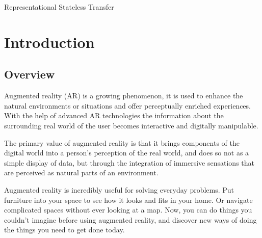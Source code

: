 \documentclass[BTech]{srmuthesis}
\begin{document}

\begin{singlespace}
\tableofcontents

\listoftables
{}
\listoffigures
{}
\end{singlespace}



\abbreviations
\begin{acronym}

 Representational Stateless Transfer

\end{acronym}


\pagebreak




\chapter{Introduction}
\section{Overview}
Augmented reality (\ac{AR}) is a growing phenomenon, it  is used to enhance the natural environments or situations and offer perceptually enriched experiences. With the help of advanced AR technologies the information about the surrounding real world of the user becomes interactive and digitally manipulable.

The primary value of augmented reality is that it brings components of the digital world into a person's perception of the real world, and does so not as a simple display of data, but through the integration of immersive sensations that are perceived as natural parts of an environment.

Augmented reality is incredibly useful for solving everyday problems. Put furniture into your space to see how it looks and fits in your home. Or navigate complicated spaces without ever looking at a map. Now, you can do things you couldn't imagine before using augmented reality, and discover new ways of doing the things you need to get done today. 
\end{document}
